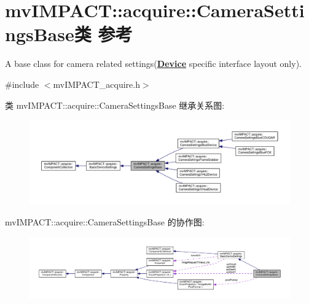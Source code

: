\hypertarget{classmv_i_m_p_a_c_t_1_1acquire_1_1_camera_settings_base}{\section{mv\+I\+M\+P\+A\+C\+T\+:\+:acquire\+:\+:Camera\+Settings\+Base类 参考}
\label{classmv_i_m_p_a_c_t_1_1acquire_1_1_camera_settings_base}
}


A base class for camera related settings({\bfseries \hyperlink{classmv_i_m_p_a_c_t_1_1acquire_1_1_device}{Device}} specific interface layout only).  




{\ttfamily \#include $<$mv\+I\+M\+P\+A\+C\+T\+\_\+acquire.\+h$>$}



类 mv\+I\+M\+P\+A\+C\+T\+:\+:acquire\+:\+:Camera\+Settings\+Base 继承关系图\+:
\nopagebreak
\begin{figure}[H]
\begin{center}
\leavevmode
\includegraphics[width=350pt]{classmv_i_m_p_a_c_t_1_1acquire_1_1_camera_settings_base__inherit__graph}
\end{center}
\end{figure}


mv\+I\+M\+P\+A\+C\+T\+:\+:acquire\+:\+:Camera\+Settings\+Base 的协作图\+:
\nopagebreak
\begin{figure}[H]
\begin{center}
\leavevmode
\includegraphics[width=350pt]{classmv_i_m_p_a_c_t_1_1acquire_1_1_camera_settings_base__coll__graph}
\end{center}
\end{figure}
